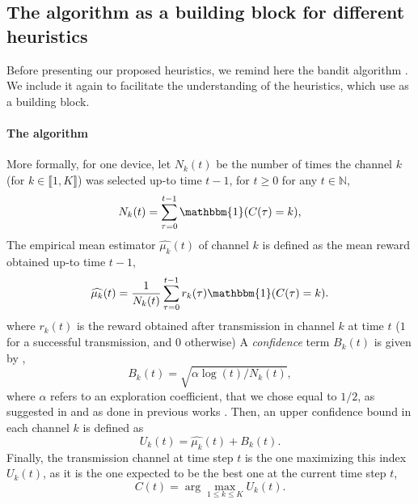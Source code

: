 
\subsection{The \UCB{} algorithm as a building block for different heuristics}
\label{sub:43:MABalgo}

Before presenting our proposed heuristics, we remind here the \UCB{} bandit algorithm \cite{Auer02}.
We include it again to facilitate the understanding of the heuristics, which use \UCB{} as a building block.


\paragraph{The \UCB{} algorithm}\label{sub:43:algoUCB}

More formally, for one device, let $N_k(t)$ be the number of times the channel $k$ (for $k\in \llbracket 1, K \rrbracket$) was selected up-to time $t-1$, for $t\geq 0$
for any $t\in\mathbb{N}$,
\begin{equation}\label{eq:43:Nkt}
	N_k(t) = \sum_{\tau=0}^{t-1} \mathbbm{1}(C(\tau) = k),
\end{equation}
The empirical mean estimator $\widehat{\mu_k}(t)$ of channel $k$ is defined as the mean reward obtained up-to time $t-1$,
\begin{equation}\label{eq:43:mukt}
	\widehat{\mu_k}(t) = \frac{1}{N_k(t)} \sum_{\tau=0}^{t-1} r_k(\tau) \mathbbm{1}(C(\tau) = k).
\end{equation}
where $r_{k}(t)$ is the reward obtained after transmission in channel $k$ at time $t$ ($1$ for a successful transmission, and $0$ otherwise)
%
A \emph{confidence} term $B_k(t)$ is given by \cite{Auer02},
\begin{equation}\label{eq:43:Bkt}
	B_k(t) = \sqrt{\alpha \log(t) / N_k(t)},
\end{equation}
where $\alpha$ refers to an exploration coefficient,
that we chose equal to $1/2$, as suggested in \cite{Audibert07} and as done in previous works \cite{Bonnefoi18,Bonnefoi17}.
Then, an upper confidence bound in each channel $k$ is defined as
\begin{equation}\label{eq:43:ucb}
	U_k(t) = \widehat{\mu_k}(t) + B_k(t).
\end{equation}
Finally, the transmission channel at time step $t$
is the one maximizing this \UCB{} index $U_k(t)$,
as it is the one expected to be the best one at the current time step $t$,
\begin{equation}\label{eq:43:maxucb}
	C(t) = \arg\max_{1\leq k \leq K} U_k(t).
\end{equation}

